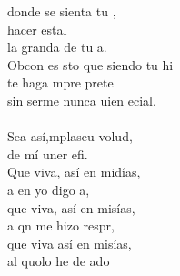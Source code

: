 \begin{cancion}
	donde  se sienta tu ,\\
	hacer estal\\
	la granda de tu a.\\
	Obcon es sto que siendo tu hi\\
	te haga mpre prete\\
	sin serme nunca uien ecial.\\
	\jump\\
	Sea así,mplaseu volud, \\
	 de mí uner efi.\\
	Que viva, así en midías,\\
	a en yo digo a,\\
	que viva, así en misías,\\
	a qn me hizo respr,\\
	que viva así en misías,\\
	al quolo he de ado\\
	\jump\\
	       \\
\end{cancion}%
